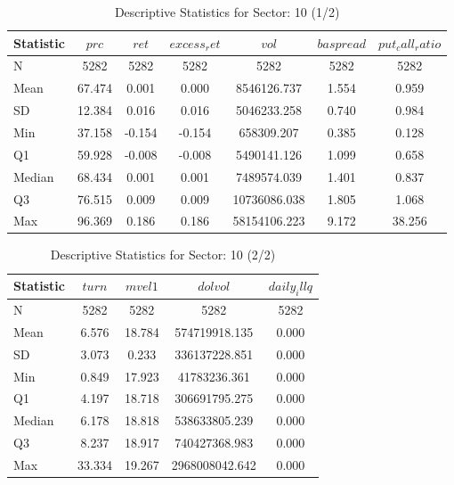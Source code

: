     \begin{table}[H]
    \centering

    
    \caption{Descriptive Statistics for Sector: 10 (1/2)}
    \label{tab:sec10_a}
    
    \begin{tabular}{lcccccc}
    \toprule
    Statistic & $prc$ & $ret$ & $excess_ret$ & $vol$ & $baspread$ & $put_call_ratio$ \\\midrule
    N & 5282 & 5282 & 5282 & 5282 & 5282 & 5282 \\
    Mean & 67.474 & 0.001 & 0.000 & 8546126.737 & 1.554 & 0.959 \\
    SD & 12.384 & 0.016 & 0.016 & 5046233.258 & 0.740 & 0.984 \\
    Min & 37.158 & -0.154 & -0.154 & 658309.207 & 0.385 & 0.128 \\
    Q1 & 59.928 & -0.008 & -0.008 & 5490141.126 & 1.099 & 0.658 \\
    Median & 68.434 & 0.001 & 0.001 & 7489574.039 & 1.401 & 0.837 \\
    Q3 & 76.515 & 0.009 & 0.009 & 10736086.038 & 1.805 & 1.068 \\
    Max & 96.369 & 0.186 & 0.186 & 58154106.223 & 9.172 & 38.256 \\
    \bottomrule
    \end{tabular}

    \end{table}
    
    \begin{table}[H]
    \centering

    
    \caption{Descriptive Statistics for Sector: 10 (2/2)}
    \label{tab:sec10_b}
    
    \begin{tabular}{lcccc}
    \toprule
    Statistic & $turn$ & $mvel1$ & $dolvol$ & $daily_illq$ \\\midrule
    N & 5282 & 5282 & 5282 & 5282 \\
    Mean & 6.576 & 18.784 & 574719918.135 & 0.000 \\
    SD & 3.073 & 0.233 & 336137228.851 & 0.000 \\
    Min & 0.849 & 17.923 & 41783236.361 & 0.000 \\
    Q1 & 4.197 & 18.718 & 306691795.275 & 0.000 \\
    Median & 6.178 & 18.818 & 538633805.239 & 0.000 \\
    Q3 & 8.237 & 18.917 & 740427368.983 & 0.000 \\
    Max & 33.334 & 19.267 & 2968008042.642 & 0.000 \\
    \bottomrule
    \end{tabular}

    \end{table}
    
